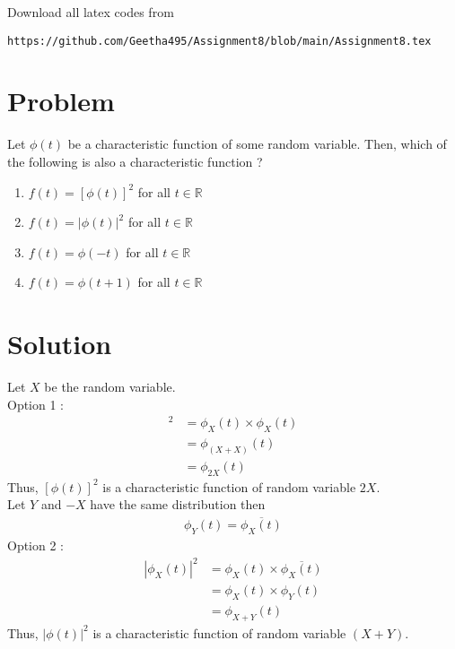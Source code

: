 \documentclass[journal,12pt,twocolumn]{IEEEtran}
\begin{document}
Download all latex codes from 
\begin{lstlisting}
https://github.com/Geetha495/Assignment8/blob/main/Assignment8.tex
\end{lstlisting}
\section{Problem}
Let $\phi(t)$ be a characteristic function of some random variable.  Then, which of the following is also a characteristic function ?
\begin{enumerate}
    \item $f(t) = [\phi(t)]^2$ for all $t \in \mathbb{R}$
    \item $f(t) = |\phi(t)|^2$ for all $t \in \mathbb{R}$
    \item $f(t) = \phi(-t)$ for all $t \in \mathbb{R}$
    \item $f(t) = \phi(t+1)$ for all $t \in \mathbb{R}$
\end{enumerate}
\section{Solution}
Let $X$ be the random variable.\\
Option 1 :\begin{align*} [\phi_X(t)]^2 &= \phi_X(t)\times\phi_X(t) \\
                &= \phi_{(X+X)}(t)\\
                &= \phi_{2X}(t)
\end{align*}
Thus, $[\phi(t)]^2$ is a characteristic function of random variable $2X$.\\
Let $Y$  and $-X$ have the same distribution then 
\begin{align*}
    \phi_Y(t) = \overline{\phi_X(t)}
\end{align*}
Option 2 :\begin{align*} |\phi_X(t)|^2 &= \phi_X(t)\times\overline{\phi_X(t)} \\
                &= \phi_X(t)\times\phi_Y(t) \\
                &= \phi_{X+Y}(t)
\end{align*}
Thus, $|\phi(t)|^2$ is a characteristic function of random variable $(X+Y)$.\\
\end{document}
